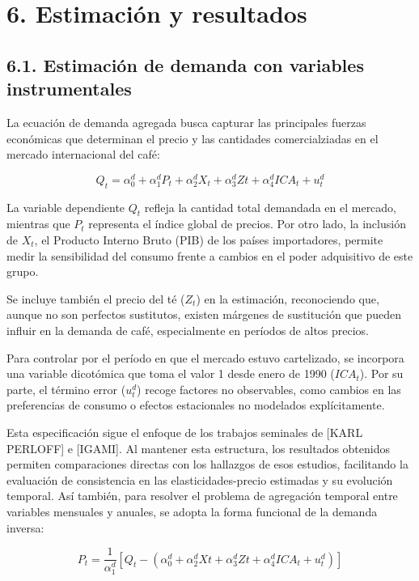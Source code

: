 \chapter*{6. Estimación y resultados}

\section*{6.1. Estimación de demanda con variables instrumentales}

La ecuación de demanda agregada busca capturar las principales fuerzas económicas que determinan el precio y las cantidades comercialziadas en el mercado internacional del café:

\begin{equation}
    Q_{t} = \alpha^{d}_{0} + \alpha^{d}_{1}P_{t} + \alpha^{d}_{2}X_{t} + \alpha^{d}_{3}Z{t} + \alpha^{d}_{4} ICA_{t} + u^{d}_{t}
\end{equation}
 
La variable dependiente $Q_{t}$ refleja la cantidad total demandada en el mercado, mientras que $P_{t}$ representa el índice global de precios. Por otro lado, la inclusión de $X_{t}$, el Producto Interno Bruto (PIB) de los países importadores, permite medir la sensibilidad del consumo frente a cambios en el poder adquisitivo de este grupo.

Se incluye también el precio del té ($Z_{t}$) en la estimación, reconociendo que, aunque no son perfectos sustitutos, existen márgenes de sustitución que pueden influir en la demanda de café, especialmente en períodos de altos precios. 

Para controlar por el período en que el mercado estuvo cartelizado, se incorpora una variable dicotómica que toma el valor 1 desde enero de 1990 ($ICA_{t}$). Por su parte, el término error ($u^{d}_{t}$) recoge factores no observables, como cambios en las preferencias de consumo o efectos estacionales no modelados explícitamente.

Esta especificación sigue el enfoque de los trabajos seminales de [KARL PERLOFF] e [IGAMI]. Al mantener esta estructura, los resultados obtenidos permiten comparaciones directas con los hallazgos de esos estudios, facilitando la evaluación de consistencia en las elasticidades-precio estimadas y su evolución temporal. Así también, para resolver el problema de agregación temporal entre variables mensuales y anuales, se adopta la forma funcional de la demanda inversa:

\begin{equation}
    P_{t} = \frac{1}{\alpha^{d}_{1}} \left[ Q_{t} - ( \alpha^{d}_{0} + \alpha^{d}_{2}X{t} + \alpha^{d}_{3}Z{t} + \alpha^{d}_{4} ICA_{t} + u^{d}_{t} ) \right]
\end{equation}


